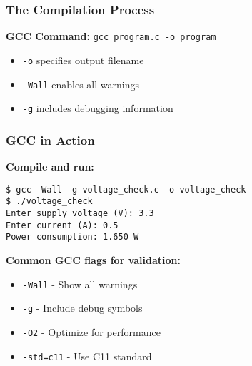 \documentclass{beamer}
\begin{document}
\begin{frame}
\frametitle{The Compilation Process}
\begin{center}
\end{center}

\textbf{GCC Command:} \texttt{gcc program.c -o program}
\begin{itemize}
    \item \texttt{-o} specifies output filename
    \item \texttt{-Wall} enables all warnings
    \item \texttt{-g} includes debugging information
\end{itemize}
\end{frame}

\begin{frame}[fragile]
\frametitle{GCC in Action}
\textbf{Compile and run:}
\begin{verbatim}
$ gcc -Wall -g voltage_check.c -o voltage_check
$ ./voltage_check
Enter supply voltage (V): 3.3
Enter current (A): 0.5
Power consumption: 1.650 W
\end{verbatim}

\textbf{Common GCC flags for validation:}
\begin{itemize}
    \item \texttt{-Wall} - Show all warnings
    \item \texttt{-g} - Include debug symbols
    \item \texttt{-O2} - Optimize for performance
    \item \texttt{-std=c11} - Use C11 standard
\end{itemize}
\end{frame}
\end{document}
